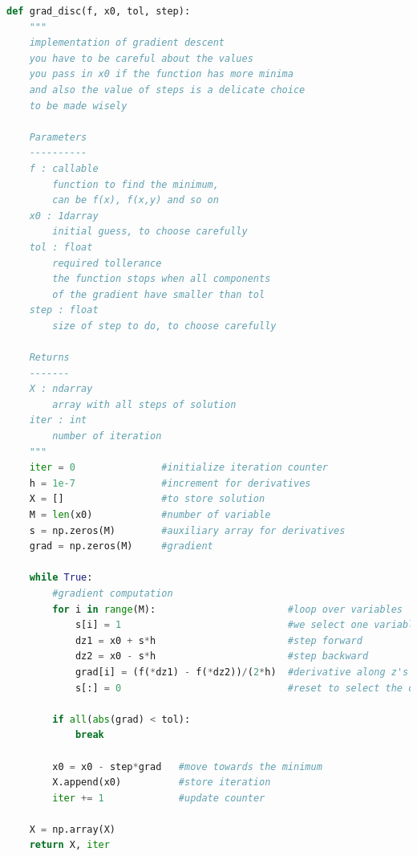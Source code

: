 \documentclass[10pt,a4paper]{article}
\begin{document}
\begin{lstlisting}[language=Python]
def grad_disc(f, x0, tol, step):
    """
    implementation of gradient descent
    you have to be careful about the values
    you pass in x0 if the function has more minima
    and also the value of steps is a delicate choice
    to be made wisely

    Parameters
    ----------
    f : callable
        function to find the minimum,
        can be f(x), f(x,y) and so on
    x0 : 1darray
        initial guess, to choose carefully
    tol : float
        required tollerance
        the function stops when all components
        of the gradient have smaller than tol
    step : float
        size of step to do, to choose carefully

    Returns
    -------
    X : ndarray
        array with all steps of solution
    iter : int
        number of iteration
    """
    iter = 0               #initialize iteration counter
    h = 1e-7               #increment for derivatives
    X = []                 #to store solution
    M = len(x0)            #number of variable
    s = np.zeros(M)        #auxiliary array for derivatives
    grad = np.zeros(M)     #gradient

    while True:
        #gradient computation
        for i in range(M):                       #loop over variables
            s[i] = 1                             #we select one variable at a time
            dz1 = x0 + s*h                       #step forward
            dz2 = x0 - s*h                       #step backward
            grad[i] = (f(*dz1) - f(*dz2))/(2*h)  #derivative along z's direction
            s[:] = 0                             #reset to select the other variables

        if all(abs(grad) < tol):
            break

        x0 = x0 - step*grad   #move towards the minimum
        X.append(x0)          #store iteration
        iter += 1             #update counter

    X = np.array(X)
    return X, iter
\end{lstlisting}
\end{document}
